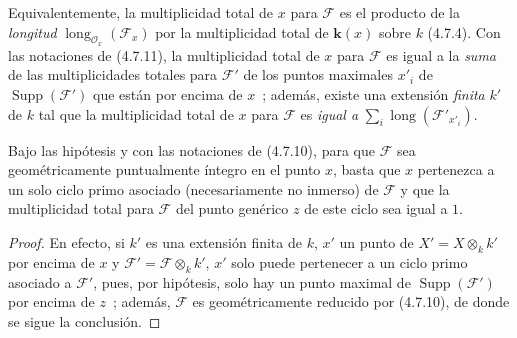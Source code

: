 Equivalentemente, la multiplicidad total de $x$ para $\mathscr F$ es el
producto de la \emph{longitud}
$\operatorname{long}_{\mathcal O_x}(\mathscr F_x)$ por la multiplicidad total
de $\boldsymbol{k}(x)$ sobre $k$ (4.7.4). Con las notaciones de (4.7.11), la multiplicidad
total de $x$ para $\mathscr F$ es igual a la \emph{suma} de las multiplicidades
totales para $\mathscr F'$ de los puntos maximales $x'_i$ de
$\operatorname{Supp}(\mathscr F')$ que están por encima de $x$~; además,
existe una extensión \emph{finita} $k'$ de $k$ tal que la multiplicidad total de $x$
para $\mathscr F$ es \emph{igual a}
$\sum_i\operatorname{long}(\mathscr F'_{x'_i})$.

\begin{proposition}[4.7.13]
\label{IV.2.4.7.13-fr}
Bajo las hipótesis y con las notaciones de \textup{(4.7.10)}, para que $\mathscr F$ sea
geométricamente puntualmente íntegro en el punto $x$, basta que $x$ pertenezca
a un solo ciclo primo asociado (necesariamente no inmerso) de $\mathscr F$ y
que la multiplicidad total para $\mathscr F$ del punto genérico $z$ de este
ciclo sea igual a $1$.
\end{proposition}

\begin{proof}
En efecto, si $k'$ es una extensión finita de $k$, $x'$ un punto de
$X'=X\otimes_k k'$ por encima de $x$ y
$\mathscr F'=\mathscr F\otimes_k k'$, $x'$ solo puede pertenecer a un ciclo
primo asociado a $\mathscr F'$, pues, por hipótesis, solo hay un punto maximal
de $\operatorname{Supp}(\mathscr F')$ por encima de $z$~; además, $\mathscr F$
es geométricamente reducido por (4.7.10), de donde se sigue la conclusión.
\end{proof}
